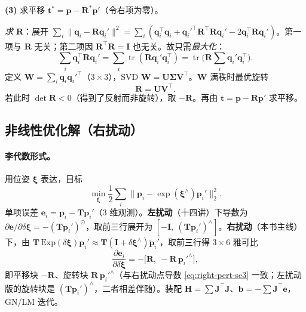 \begin{derivation}
\textbf{(3)} 求平移 $\mathbf{t}^*=\mathbf{p}-\mathbf{R}^*\mathbf{p}'$（令右项为零）。

\emph{求 $\mathbf{R}$}：展开 $\sum_i\|\mathbf{q}_i-\mathbf{R}\mathbf{q}_i'\|^2=\sum_i(\mathbf{q}_i^\top\mathbf{q}_i+\mathbf{q}_i'^\top\mathbf{R}^\top\mathbf{R}\mathbf{q}_i'-2\mathbf{q}_i^\top\mathbf{R}\mathbf{q}_i')$。第一项与 $\mathbf{R}$ 无关；第二项因 $\mathbf{R}^\top\mathbf{R}=\mathbf{I}$ 也无关。故只需\emph{最大化}：
\begin{equation}
  \sum_i\mathbf{q}_i^\top\mathbf{R}\mathbf{q}_i'=\sum_i\operatorname{tr}(\mathbf{R}\mathbf{q}_i'\mathbf{q}_i^\top)=\operatorname{tr}\!\Big(\mathbf{R}\sum_i\mathbf{q}_i'\mathbf{q}_i^\top\Big).
  \label{eq:vo-icp-trace}
\end{equation}
定义 $\mathbf{W}=\sum_i\mathbf{q}_i\mathbf{q}_i'^\top$（$3\times3$），SVD $\mathbf{W}=\mathbf{U}\boldsymbol{\Sigma}\mathbf{V}^\top$。$\mathbf{W}$ 满秩时最优旋转
\begin{equation}
  \boxed{\ \mathbf{R}=\mathbf{U}\mathbf{V}^\top.\ }
  \label{eq:vo-icp-R}
\end{equation}
若此时 $\det\mathbf{R}<0$（得到了反射而非旋转），取 $-\mathbf{R}$。再由 $\mathbf{t}=\mathbf{p}-\mathbf{R}\mathbf{p}'$ 求平移。
\end{derivation}

\subsection{非线性优化解（右扰动）}
\label{sec:vo-icp-nl}

\paragraph{李代数形式\cite{gaoxiang2019slam14}。}用位姿 $\boldsymbol{\xi}$ 表达，目标
\begin{equation}
  \min_{\boldsymbol{\xi}}\frac12\sum_i\big\|\mathbf{p}_i-\exp(\boldsymbol{\xi}^\wedge)\mathbf{p}_i'\big\|_2^2.
  \label{eq:vo-icp-nl}
\end{equation}
单项误差 $\mathbf{e}_i=\mathbf{p}_i-\mathbf{T}\mathbf{p}_i'$（$3$ 维观测）。\textbf{左扰动}（十四讲）下导数为 $\partial\mathbf{e}/\partial\delta\boldsymbol{\xi}=-(\mathbf{T}\mathbf{p}_i')^\odot$，取前三行展开为 $[-\mathbf{I},\ (\mathbf{T}\mathbf{p}_i')^\wedge]$。\textbf{右扰动}（本书主线）下，由 $\mathbf{T}\,\mathrm{Exp}(\delta\boldsymbol{\xi})\mathbf{p}_i'\approx\mathbf{T}(\mathbf{I}+\delta\boldsymbol{\xi}^\wedge)\tilde{\mathbf{p}}_i'$，取前三行得 $3\times6$ 雅可比
\begin{equation}
  \frac{\partial\mathbf{e}_i}{\partial\delta\boldsymbol{\xi}}=-\big[\mathbf{R},\ -\mathbf{R}\,\mathbf{p}_i'^\wedge\big],
  \label{eq:vo-icp-jac-right}
\end{equation}
即平移块 $-\mathbf{R}$、旋转块 $\mathbf{R}\,\mathbf{p}_i'^\wedge$（与右扰动点导数 \cref{eq:right-pert-se3} 一致；左扰动版的旋转块是 $(\mathbf{T}\mathbf{p}_i')^\wedge$，二者相差伴随）。装配 $\mathbf{H}=\sum\mathbf{J}^\top\mathbf{J}$、$\mathbf{b}=-\sum\mathbf{J}^\top\mathbf{e}$，GN/LM 迭代。

